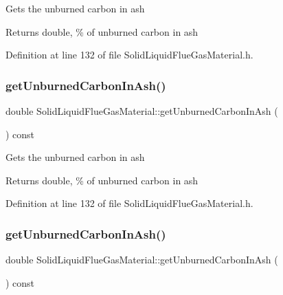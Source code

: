 Gets the unburned carbon in ash \begin{DoxyReturn}{Returns}
double, \% of unburned carbon in ash 
\end{DoxyReturn}


Definition at line 132 of file Solid\+Liquid\+Flue\+Gas\+Material.\+h.

\mbox{\label{class_solid_liquid_flue_gas_material_a53ac34a949168a35297ab3afb9eb2c7b}} 
\subsubsection{\texorpdfstring{get\+Unburned\+Carbon\+In\+Ash()}{getUnburnedCarbonInAsh()}\hspace{0.1cm}{\footnotesize\ttfamily [2/3]}}
{\footnotesize\ttfamily double Solid\+Liquid\+Flue\+Gas\+Material\+::get\+Unburned\+Carbon\+In\+Ash (\begin{DoxyParamCaption}{ }\end{DoxyParamCaption}) const\hspace{0.3cm}{\ttfamily [inline]}}

Gets the unburned carbon in ash \begin{DoxyReturn}{Returns}
double, \% of unburned carbon in ash 
\end{DoxyReturn}


Definition at line 132 of file Solid\+Liquid\+Flue\+Gas\+Material.\+h.

\mbox{\label{class_solid_liquid_flue_gas_material_a53ac34a949168a35297ab3afb9eb2c7b}} 
\subsubsection{\texorpdfstring{get\+Unburned\+Carbon\+In\+Ash()}{getUnburnedCarbonInAsh()}\hspace{0.1cm}{\footnotesize\ttfamily [3/3]}}
{\footnotesize\ttfamily double Solid\+Liquid\+Flue\+Gas\+Material\+::get\+Unburned\+Carbon\+In\+Ash (\begin{DoxyParamCaption}{ }\end{DoxyParamCaption}) const\hspace{0.3cm}{\ttfamily [inline]}}

